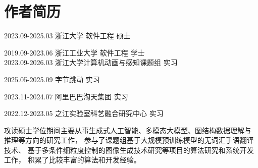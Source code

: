 \chapter{作者简历}



2023.09-2025.03 \quad  \quad 浙江大学 \quad \quad \quad \quad 软件工程 \quad \quad \quad 硕士

2019.09-2023.06 \quad  \quad 浙江工业大学 \quad \quad 软件工程 \quad \quad \quad 学士 \\

2023.09-2026.03 \quad  \quad 浙江大学计算机动画与感知课题组  \quad 实习

2025.05-2025.09 \quad  \quad 字节跳动  \quad 实习

2023.11-2024.07 \quad  \quad 阿里巴巴淘天集团  \quad 实习

2022.12-2023.05 \quad  \quad 之江实验室科艺融合研究中心  \quad 实习
\\


攻读硕士学位期间主要从事生成式人工智能、多模态大模型、图结构数据理解与
推理等方向的研究工作，
参与了课题组基于大规模预训练模型的无词汇手语翻译技术、
基于多条件细粒度控制的图像生成技术研究等项目的算法研究和系统开发工作，
积累了比较丰富的算法和开发经验。

